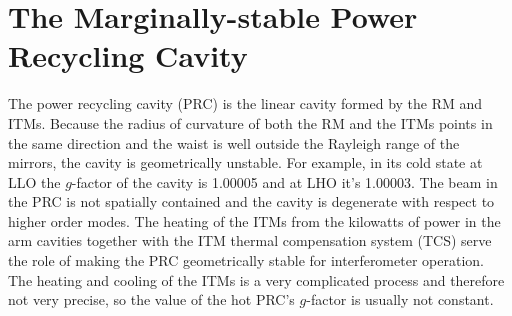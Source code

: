 





\section{The Marginally-stable Power Recycling Cavity}
The power recycling cavity (PRC) is the linear cavity formed by the RM
and ITMs. Because the radius of curvature of both the RM and the ITMs
points in the same direction and the waist is well outside the
Rayleigh range of the mirrors, the cavity is geometrically
unstable. For example, in its cold state at LLO the $g$-factor of the
cavity is 1.00005 and at LHO it's 1.00003. The beam in the PRC is not
spatially contained and the cavity is degenerate with respect to
higher order modes. The heating of the ITMs from the kilowatts of
power in the arm cavities together with the ITM thermal compensation
system (TCS) serve the role of making the PRC geometrically stable for
interferometer operation. The heating and cooling of the ITMs is a
very complicated process and therefore not very precise, so the value
of the hot PRC's $g$-factor is usually not constant.

